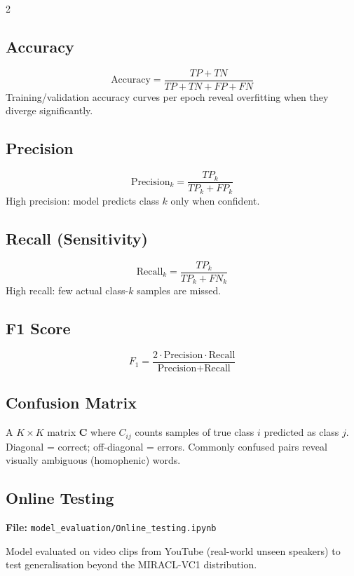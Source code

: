 \documentclass[10pt, a4paper]{article}
\begin{document}
\begin{multicols}{2}
\subsection{Accuracy}
\begin{equation}
\text{Accuracy} = \frac{TP + TN}{TP + TN + FP + FN}
\end{equation}
Training/validation accuracy curves per epoch reveal overfitting when
they diverge significantly.

\subsection{Precision}
\begin{equation}
\text{Precision}_k = \frac{TP_k}{TP_k + FP_k}
\end{equation}
High precision: model predicts class $k$ only when confident.

\subsection{Recall (Sensitivity)}
\begin{equation}
\text{Recall}_k = \frac{TP_k}{TP_k + FN_k}
\end{equation}
High recall: few actual class-$k$ samples are missed.

\subsection{F1 Score}
\begin{equation}
F_1 = \frac{2 \cdot \text{Precision} \cdot \text{Recall}}
           {\text{Precision} + \text{Recall}}
\end{equation}

\subsection{Confusion Matrix}
A $K \times K$ matrix $\mathbf{C}$ where $C_{ij}$ counts samples of
true class $i$ predicted as class $j$.
Diagonal = correct; off-diagonal = errors.
Commonly confused pairs reveal visually ambiguous (homophenic) words.

\subsection{Online Testing}
\textbf{File:} \texttt{model\_evaluation/Online\_testing.ipynb}

Model evaluated on video clips from YouTube (real-world unseen speakers)
to test generalisation beyond the MIRACL-VC1 distribution.


\end{multicols}
\end{document}
